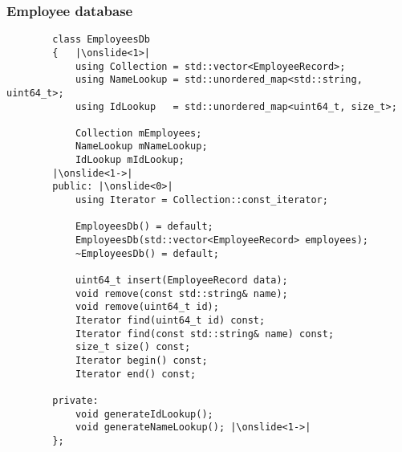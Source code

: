 \documentclass{beamer}
\begin{document}
\begin{frame}[fragile,t]
\frametitle{Employee database}
	\begin{lstlisting}
		class EmployeesDb
		{	|\onslide<1>|
		    using Collection = std::vector<EmployeeRecord>;
		    using NameLookup = std::unordered_map<std::string, uint64_t>;
		    using IdLookup   = std::unordered_map<uint64_t, size_t>;
		
		    Collection mEmployees;
		    NameLookup mNameLookup;
		    IdLookup mIdLookup;
		|\onslide<1->|
		public: |\onslide<0>|
		    using Iterator = Collection::const_iterator;
			
		    EmployeesDb() = default;
		    EmployeesDb(std::vector<EmployeeRecord> employees);
		    ~EmployeesDb() = default;
			
		    uint64_t insert(EmployeeRecord data);
		    void remove(const std::string& name);
		    void remove(uint64_t id);
		    Iterator find(uint64_t id) const;
		    Iterator find(const std::string& name) const;
		    size_t size() const;
		    Iterator begin() const;
		    Iterator end() const;
	
		private:
		    void generateIdLookup();
		    void generateNameLookup(); |\onslide<1->|
		};
	\end{lstlisting}
\end{frame}
\end{document}
